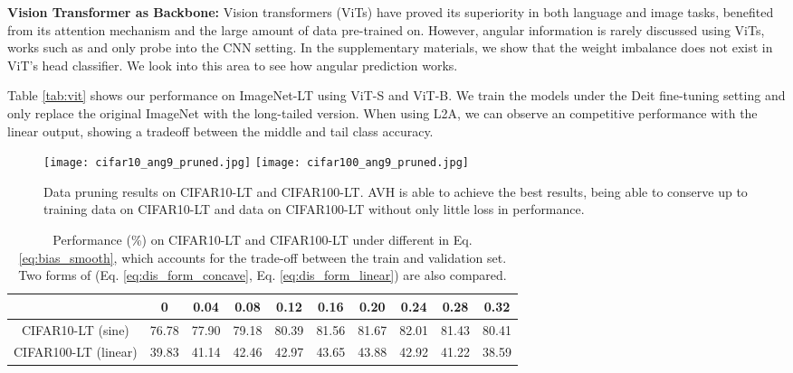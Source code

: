\documentclass[10pt,twocolumn,letterpaper]{article}
\begin{document}
\textbf{Vision Transformer as Backbone:} Vision transformers (ViTs) \cite{vit} have proved its superiority in both language and image tasks, benefited from its attention mechanism and the large amount of data pre-trained on. However, angular information is rarely discussed using ViTs, works such as \cite{decoupledNet} and \cite{avh} only probe into the CNN setting. In the supplementary materials, we show that the weight imbalance does not exist in ViT's head classifier. We look into this area to see how angular prediction works. 

Table \ref{tab:vit} shows our performance on ImageNet-LT using ViT-S and ViT-B. We train the models under the Deit \cite{deit} fine-tuning setting and only replace the original ImageNet with the long-tailed version. When using L2A, we can observe an competitive performance with the linear output, showing a tradeoff between the middle and tail class accuracy. 


\begin{figure}[t!]
  \centering
   \texttt{[image: cifar10\_ang9\_pruned.jpg]}
   \texttt{[image: cifar100\_ang9\_pruned.jpg]}\vspace{-5pt}
   \caption{Data pruning results on CIFAR10-LT and CIFAR100-LT. AVH is able to achieve the best results, being able to conserve up to  training data on CIFAR10-LT and  data on CIFAR100-LT without only little loss in performance.}
   \label{fig:exp_data_prune}
\end{figure}
\begin{table*}[tb!]
\centering
\caption{Performance (\%) on CIFAR10-LT and CIFAR100-LT under different  in Eq. \ref{eq:bias_smooth}, which accounts for the trade-off between the train and validation set. Two forms of  (Eq. \ref{eq:dis_form_concave}, Eq. \ref{eq:dis_form_linear}) are also compared.}
\vspace{-5pt}
\begin{tabular}{c|ccccccccc}
\hline
           & 0 & 0.04 & 0.08 & 0.12 & 0.16 & 0.20 & 0.24 & 0.28 & 0.32 \\ \hline \hline
CIFAR10-LT (sine) & 76.78 & 77.90 & 79.18 & 80.39 & 81.56 & 81.67 & 82.01 & 81.43 & 80.41 \\ \hline 
CIFAR100-LT (linear) & 39.83 & 41.14 & 42.46 & 42.97 & 43.65 & 43.88 & 42.92 & 41.22 & 38.59 \\ \hline
\end{tabular}
\label{tab:ablation_s}
\end{table*}
\end{document}
